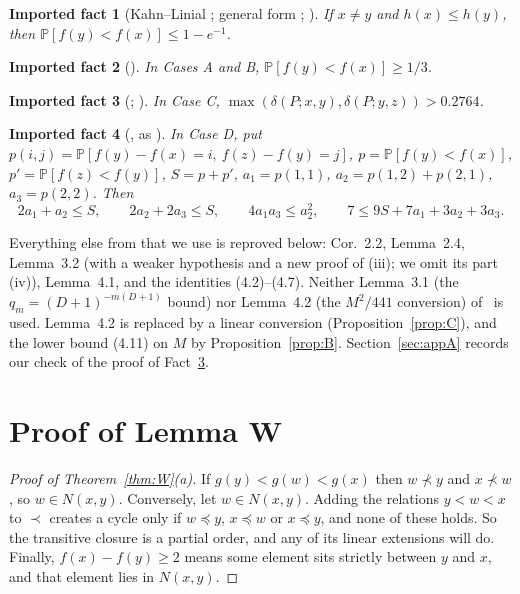 \documentclass[10pt]{amsart}
\newtheorem{fact}{Imported fact}
\theoremstyle{definition}
\theoremstyle{remark}
\newcommand{\PP}{\mathbb{P}}
\begin{document}
\begin{fact}[Kahn--Linial {\cite[p.~365]{KL91}}; general form {\cite[Cor.~5.1(b)]{AK25a}}; {\cite[Lemma~2.1]{KSBFT}}]\label{I:KL}
If $x\ne y$ and $h(x)\le h(y)$, then $\PP[f(y)<f(x)]\le 1-e^{-1}$.
\end{fact}
\begin{fact}[{\cite[Thms.~4.1, 4.2]{BFT95}}]\label{I:AB}
In Cases A and B, $\PP[f(y)<f(x)]\ge 1/3$.
\end{fact}
\begin{fact}[{\cite[L.~2.3, App.~A]{KSBFT}}; {\cite[\S6]{BFT95}}]\label{I:C}
In Case C, $\max(\delta(P;x,y),\delta(P;y,z))>0.2764$.
\end{fact}
\begin{fact}[{\cite[(5.2), (5.5), (5.7), (5.8)]{BFT95}}, as {\cite[(2.1)--(2.2)]{KSBFT}}]\label{I:D}
In Case D, put $p(i,j)=\PP[f(y)-f(x)=i,\ f(z)-f(y)=j]$, $p=\PP[f(y)<f(x)]$, $p'=\PP[f(z)<f(y)]$, $S=p+p'$, $a_1=p(1,1)$, $a_2=p(1,2)+p(2,1)$, $a_3=p(2,2)$. Then
\[
2a_1+a_2\le S,\qquad 2a_2+2a_3\le S,\qquad 4a_1a_3\le a_2^2,\qquad 7\le 9S+7a_1+3a_2+3a_3 .
\]
\end{fact}

Everything else from \cite{KSBFT} that we use is reproved below: Cor.~2.2, Lemma~2.4, Lemma~3.2 (with a weaker hypothesis and a new proof of (iii); we omit its part (iv)), Lemma~4.1, and the identities (4.2)--(4.7).
Neither Lemma~3.1 (the $q_m=(D+1)^{-m(D+1)}$ bound) nor Lemma~4.2 (the $M^2/441$ conversion) of~\cite{KSBFT} is used.
Lemma~4.2 is replaced by a linear conversion (Proposition~\ref{prop:C}), and the lower bound (4.11) on $M$ by Proposition~\ref{prop:B}.
Section~\ref{sec:appA} records our check of the proof of Fact~\ref{I:C}.

\section{Proof of Lemma W}

\begin{proof}[Proof of Theorem~\ref{thm:W}(a)]
If $g(y)<g(w)<g(x)$ then $w\not\prec y$ and $x\not\prec w$, so $w\in N(x,y)$.
Conversely, let $w\in N(x,y)$. Adding the relations $y<w<x$ to $\prec$ creates a cycle only if $w\preceq y$, $x\preceq w$ or $x\preceq y$, and none of these holds.
So the transitive closure is a partial order, and any of its linear extensions will do.
Finally, $f(x)-f(y)\ge2$ means some element sits strictly between $y$ and $x$, and that element lies in $N(x,y)$.
\end{proof}
\end{document}
